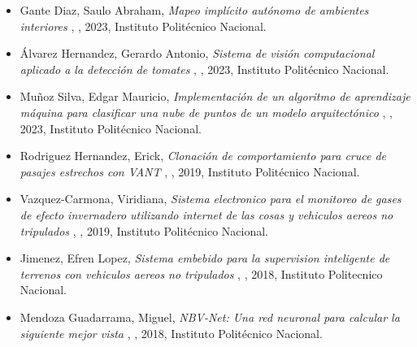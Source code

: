 \begin{itemize} 
\item Gante Diaz, Saulo Abraham, \textit{ Mapeo implícito autónomo de ambientes interiores }, \href{ https://jivg.org/wp-content/uploads/2023/02/2023_maestria_Gante.pdf }{\faFilePdfO}, 2023, Instituto Polit\'ecnico Nacional. 
\item Álvarez Hernandez, Gerardo Antonio, \textit{ Sistema de visión computacional aplicado a
la detección de tomates }, \href{ https://jivg.org/wp-content/uploads/2024/01/2023_maestria_Alvarez.pdf }{\faFilePdfO}, 2023, Instituto Polit\'ecnico Nacional. 
\item Muñoz Silva, Edgar Mauricio, \textit{ Implementación de un algoritmo de aprendizaje máquina para clasificar una nube de puntos de un modelo arquitectónico }, \href{ https://jivg.org/wp-content/uploads/2024/01/2023_maestria_Silva.pdf }{\faFilePdfO}, 2023, Instituto Polit\'ecnico Nacional. 
\item Rodriguez Hernandez, Erick, \textit{ Clonaci\'on de comportamiento para cruce de pasajes estrechos con VANT }, \href{ https://jivasquez.files.wordpress.com/2019/08/tesiserhempastar.pdf }{\faFilePdfO}, 2019, Instituto Polit\'ecnico Nacional. 
\item Vazquez-Carmona, Viridiana, \textit{ Sistema electronico para el monitoreo de gases de efecto invernadero utilizando internet de las cosas y vehiculos aereos no tripulados }, \href{ https://jivasquez.files.wordpress.com/2020/09/2019_maestria_vazquez.pdf }{\faFilePdfO}, 2019, Instituto Polit\'ecnico Nacional. 
\item Jimenez, Efren Lopez, \textit{ Sistema embebido para la supervision inteligente de terrenos con vehiculos aereos no tripulados }, \href{ https://jivasquez.files.wordpress.com/2018/12/master_thesis_2018_lopez.pdf }{\faFilePdfO}, 2018, Instituto Politecnico Nacional. 
\item Mendoza Guadarrama, Miguel, \textit{ NBV-Net: Una red neuronal para calcular la siguiente mejor vista }, \href{ https://jivasquez.files.wordpress.com/2018/12/2018_maestria_Mendoza.pdf }{\faFilePdfO}, 2018, Instituto Politécnico Nacional. 
\end{itemize} 
